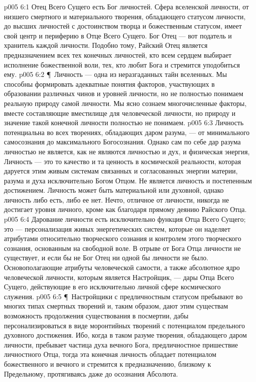 \vs p005 6:1 Отец Всего Сущего есть Бог личностей. Сфера вселенской личности, от низшего смертного и материального творения, обладающего статусом личности, до высших личностей с достоинством творца и божественным статусом, имеет свой центр и периферию в Отце Всего Сущего. Бог Отец --- вот податель и хранитель каждой личности. Подобно тому, Райский Отец является предназначением всех тех конечных личностей, кто всем сердцем выбирает исполнение божественной воли, тех, кто любит Бога и стремится уподобиться ему.
\vs p005 6:2 \P\ Личность --- одна из неразгаданных тайн вселенных. Мы способны формировать адекватные понятия факторов, участвующих в образовании различных чинов и уровней личности, но не полностью понимаем реальную природу самой личности. Мы ясно сознаем многочисленные факторы, вместе составляющие вместилище для человеческой личности, но природу и значение такой конечной личности полностью не понимаем.
\vs p005 6:3 Личность потенциальна во всех творениях, обладающих даром разума, --- от минимального самосознания до максимального Богосознания. Однако сам по себе дар разума личностью не является, как не являются личностью и дух, и физическая энергия, Личность --- это то качество и та ценность в космической реальности, которая даруется этим живым системам связанных и согласованных энергии материи, разума и духа исключительно Богом Отцом. Не является личность и постепенным достижением. Личность может быть материальной или духовной, однако личность либо есть, либо ее нет. Нечто, отличное от личности, никогда не достигает уровня личного, кроме как благодаря прямому деянию Райского Отца.
\vs p005 6:4 Дарование личности есть исключительно функция Отца Всего Сущего; это --- персонализация живых энергетических систем, которые он наделяет атрибутами относительно творческого сознания и контролем этого творческого сознания, основанным на свободной воле. В отрыве от Бога Отца личности не существует, и если бы не Бог Отец ни одной бы личности не было. Основополагающие атрибуты человеческой самости, а также абсолютное ядро человеческой личности, которым является Настройщик, --- дары Отца Всего Сущего, действующие в его исключительно личной сфере космического служения.
\vs p005 6:5 \P\ Настройщики с предличностным статусом пребывают во многих типах смертных творений и, таким образом, дают этим существам возможность продолжения существования в посмертии, дабы персонализироваться в виде моронтийных творений с потенциалом предельного духовного достижения. Ибо, когда в таком разуме творения, обладающего даром личности, пребывает частица духа вечного Бога, предличностное пришествие личностного Отца, тогда эта конечная личность обладает потенциалом божественного и вечного и стремится к предназначению, близкому к Предельному, протягиваясь даже до осознания Абсолюта.
